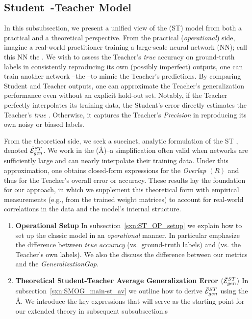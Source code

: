 \subsection{Student~-Teacher Model}
\label{sxn:SMOG_main-student_teacher}

In this subsubsection, we present a unified view of the \emph{\StudentTeacher} (ST) model from both a practical and a theoretical perspective.  
From the practical (\emph{operational}) side, imagine a real-world practitioner training a large-scale neural network (NN); call this NN the \Teacher.  
We wish to assess the Teacher’s \emph{true} accuracy on ground-truth labels in consistently reproducing its own (possibly imperfect) outputs, one can train another network --the \Student--to mimic the Teacher’s predictions.  
By comparing Student and Teacher outputs, one can approximate the Teacher’s generalization performance even without an explicit hold-out set.  
Notably, if the Teacher perfectly interpolates its training data, the Student’s error directly estimates the Teacher’s \emph{true} \GeneralizationAccuracy.
Otherwise, it captures the Teacher’s \emph{Precision} in reproducing its own noisy or biased labels.

From the theoretical side, we seek a succinct, analytic formulation of the ST \AverageGeneralizationError, denoted $\bar{\mathcal{E}}^{ST}_{gen}$.  
We work in the \AnnealedApproximation (\AA)--a simplification often valid when networks are sufficiently large and can nearly interpolate their training data. 
Under this approximation, one obtains closed-form expressions for the \StudentTeacher \emph{Overlap} $(R)$
and thus for the Teacher’s overall error or accuracy.  
These results lay the foundation for our \emph{\SemiEmpirical} approach, in which we supplement this theoretical form with empirical measurements (e.g., from the trained weight matrices) to account for real-world correlations in the data and the model’s internal structure.  

\begin{enumerate}[label=4.3.\arabic*]
\item
  \textbf{Operational Setup}
  In subsection~\ref{sxn:ST_OP_setup} we explain how to set up the classic \StudentTeacher
  model in an \emph{operational} manner. 
  In particular  emphasize the difference between \emph{true accuracy} (vs.\ ground-truth labels)
  and \Precision   (vs. the Teacher’s own labels). We also the discuss the difference between
  our \Quality metrics and the \emph{GeneralizationGap}.

  \item
    \textbf{Theoretical Student-Teacher Average Generalization Error $(\bar{\mathcal{E}}^{ST}_{gen})$}
    In subsection~\ref{sxn:SMOG_main-st_av}  we outline how to derive $\bar{\mathcal{E}}^{ST}_{gen}$ using the \AA.  
    We introduce the key expressions that will serve as the starting point for our extended \SemiEmpirical theory in subsequent subsubsection.s
\end{enumerate}




